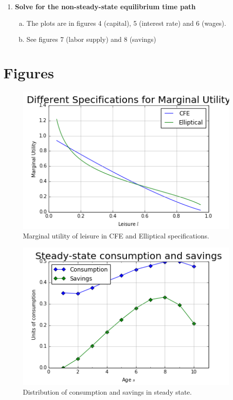 \documentclass[letterpaper,12pt]{article}
\theoremstyle{definition}
\begin{document}
\begin{enumerate}
	\item \textbf{Solve for the non-steady-state equilibrium time path}
	
	\begin{enumerate}[(a)]
	\item The plots are in figures 4 (capital), 5 (interest rate) and 6 (wages).
	\item See figures 7 (labor supply) and 8 (savings)
	\end{enumerate}
\end{enumerate}

\clearpage
\section*{Figures}

\begin{figure}[h!]
	\centering
	\includegraphics[scale=.8]{code/images/utility_leisure}
	\caption{Marginal utility of leisure in CFE and Elliptical specifications.}
	\end{figure}

\begin{figure}[h!]
	\centering
	\includegraphics[scale=.8]{code/images/SS_bc}
	\caption{Distribution of consumption and savings in steady state.}
	\end{figure}
	
\end{document}
